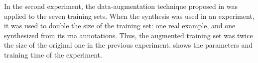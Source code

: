 
In the second experiment, the data-augmentation technique
proposed in \textcite{napoleslopez2021augmentednet} was
applied to the seven training sets. When the synthesis was
used in an experiment, it was used to double the size of the
training set: one real example, and one synthesized from its
\gls{rna} annotations. Thus, the augmented training set was
twice the size of the original one in the previous
experiment.  shows the
parameters and training time of the experiment.

